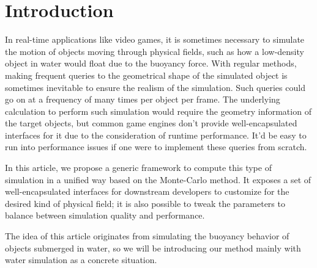 \section{Introduction}

In real-time applications like video games, it is sometimes necessary to simulate the motion of objects moving through physical fields, such as how a low-density object in water would float due to the buoyancy force.
With regular methods, making frequent queries to the geometrical shape of the simulated object is sometimes inevitable to ensure the realism of the simulation.
Such queries could go on at a frequency of many times per object per frame.
The underlying calculation to perform such simulation would require the geometry information of the target objects, but common game engines don't provide well-encapsulated interfaces for it due to the consideration of runtime performance.
It'd be easy to run into performance issues if one were to implement these queries from scratch.

In this article, we propose a generic framework to compute this type of simulation in a unified way based on the Monte-Carlo method.
It exposes a set of well-encapsulated interfaces for downstream developers to customize for the desired kind of physical field;
it is also possible to tweak the parameters to balance between simulation quality and performance.

The idea of this article originates from simulating the buoyancy behavior of objects submerged in water, so we will be introducing our method mainly with water simulation as a concrete situation.